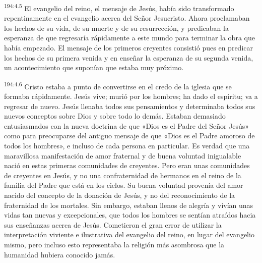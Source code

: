 \par 
\textsuperscript{194:4.5} El evangelio del reino, el mensaje de Jesús, había sido transformado repentinamente en el evangelio acerca del Señor Jesucristo. Ahora proclamaban los hechos de su vida, de su muerte y de su resurrección, y predicaban la esperanza de que regresaría rápidamente a este mundo para terminar la obra que había empezado. El mensaje de los primeros creyentes consistió pues en predicar los hechos de su primera venida y en enseñar la esperanza de su segunda venida, un acontecimiento que suponían que estaba muy próximo.

\par 
\textsuperscript{194:4.6} Cristo estaba a punto de convertirse en el credo de la iglesia que se formaba rápidamente. Jesús vive; murió por los hombres; ha dado el espíritu; va a regresar de nuevo. Jesús llenaba todos sus pensamientos y determinaba todos sus nuevos conceptos sobre Dios y sobre todo lo demás. Estaban demasiado entusiasmados con la nueva doctrina de que «Dios es el Padre del Señor Jesús» como para preocuparse del antiguo mensaje de que «Dios es el Padre amoroso de todos los hombres», e incluso de cada persona en particular. Es verdad que una maravillosa manifestación de amor fraternal y de buena voluntad inigualable nació en estas primeras comunidades de creyentes. Pero eran unas comunidades de creyentes en Jesús, y no una confraternidad de hermanos en el reino de la familia del Padre que está en los cielos. Su buena voluntad provenía del amor nacido del concepto de la donación de Jesús, y no del reconocimiento de la fraternidad de los mortales. Sin embargo, estaban llenos de alegría y vivían unas vidas tan nuevas y excepcionales, que todos los hombres se sentían atraídos hacia sus enseñanzas acerca de Jesús. Cometieron el gran error de utilizar la interpretación viviente e ilustrativa del evangelio del reino, en lugar del evangelio mismo, pero incluso esto representaba la religión más asombrosa que la humanidad hubiera conocido jamás.

